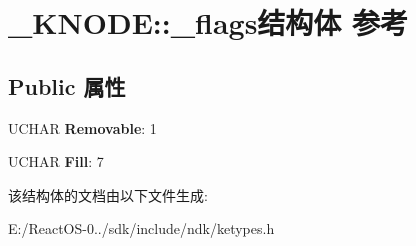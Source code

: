 \hypertarget{struct___k_n_o_d_e_1_1__flags}{}\section{\+\_\+\+K\+N\+O\+DE\+:\+:\+\_\+flags结构体 参考}
\label{struct___k_n_o_d_e_1_1__flags}
\subsection*{Public 属性}
\begin{DoxyCompactItemize}
\item 
\mbox{\label{struct___k_n_o_d_e_1_1__flags_aaf185471c89308265d3ddd97658aa3bd}} 
U\+C\+H\+AR {\bfseries Removable}\+: 1
\item 
\mbox{\label{struct___k_n_o_d_e_1_1__flags_ad7b6ed81d6bbdcb6e96e764369bc0090}} 
U\+C\+H\+AR {\bfseries Fill}\+: 7
\end{DoxyCompactItemize}


该结构体的文档由以下文件生成\+:\begin{DoxyCompactItemize}
\item 
E\+:/\+React\+O\+S-\/0../sdk/include/ndk/ketypes.\+h\end{DoxyCompactItemize}
